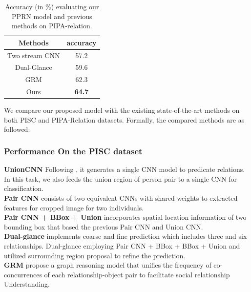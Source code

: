 \documentclass{article}
\newcommand{\PPRN}{{\sf PPRN}}
\begin{document}
\begin{table}[htpb]
  \centering
  \caption{Accuracy (in \%) evaluating our {\PPRN} model and previous methods on PIPA-relation.}
  \label{tab:pipa_table}
  \begin{tabular}{c|c}
    \hline
    Methods & accuracy \\
    \hline\hline
    Two stream CNN \cite{DBLP:conf/cvpr/ZhangPTFB15} & 57.2 \\
    Dual-Glance \cite{DBLP:conf/iccv/LiWZK17} & 59.6 \\
    GRM \cite{DBLP:conf/ijcai/WangCRYCL18} & 62.3 \\
    \hline
    Ours & \textbf{64.7}\\
    \hline
  \end{tabular}
\end{table}

We compare our proposed model with the existing state-of-the-art methods on both PISC and PIPA-Relation datasets. Formally, the compared methods are as followed:

\subsubsection{Performance On the PISC dataset}

{\bf UnionCNN}  Following \cite{DBLP:conf/eccv/LuKBL16}, it generates a single CNN model to predicate relations. In this task, we also feeds the union region of person pair to a single CNN for classification.\\
{\bf Pair CNN}\cite{DBLP:conf/iccv/LiWZK17} consists of two equivalent CNNs with shared weights to extracted features for cropped image for two individuals.\\
{\bf Pair CNN + BBox + Union}\cite{DBLP:conf/iccv/LiWZK17} incorporates spatial location information of two bounding box that based the previous Pair CNN and Union CNN.\\
{\bf Dual-glance}\cite{DBLP:conf/iccv/LiWZK17} implements coarse and fine prediction which includes three and six relationships. Dual-glance employing Pair CNN + BBox + BBox + Union and utilized surrounding region proposal to refine the prediction.\\
{\bf GRM}\cite{DBLP:conf/ijcai/WangCRYCL18} propose a graph reasoning model that unifies the frequency of co-concurrences of each relationship-object pair to facilitate social relationship Understanding.
\end{document}
